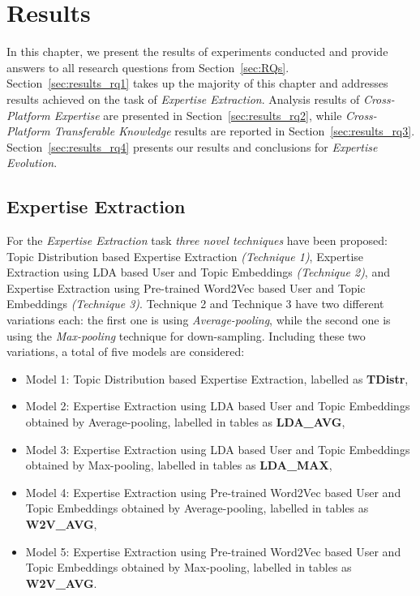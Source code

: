 \chapter{Results\label{chap:result}}

    In this chapter, we present the results of experiments conducted and provide answers to all research questions from Section~\ref{sec:RQs}. Section~\ref{sec:results_rq1} takes up the majority of this chapter and addresses results achieved on the task of \emph{Expertise Extraction}. Analysis results of \emph{Cross-Platform Expertise} are presented in Section~\ref{sec:results_rq2}, while \emph{Cross-Platform Transferable Knowledge} results are reported in Section~\ref{sec:results_rq3}.  Section~\ref{sec:results_rq4} presents our results and conclusions for \emph{Expertise Evolution}.

    \section{Expertise Extraction\label{sec:results_rq1}}
        
       For the \emph{Expertise Extraction} task \emph{three novel techniques} have been proposed: Topic Distribution based Expertise Extraction \emph{(Technique 1)}, Expertise Extraction using LDA based User and Topic Embeddings \emph{(Technique 2)}, and Expertise Extraction using Pre-trained Word2Vec based User and Topic Embeddings \emph{(Technique 3)}. Technique 2 and Technique 3 have two different variations each: the first one is using \emph{Average-pooling}, while the second one is using the \emph{Max-pooling} technique for down-sampling. Including these two variations, a total of five models are considered:
        
        \begin{itemize}
            \item Model 1: Topic Distribution based Expertise Extraction, labelled as \textbf{TDistr},
            \item Model 2: Expertise Extraction using LDA based User and Topic Embeddings obtained by Average-pooling, labelled in tables as \textbf{LDA\_AVG},
            \item Model 3: Expertise Extraction using LDA based User and Topic Embeddings obtained by Max-pooling, labelled in tables as \textbf{LDA\_MAX},
            \item Model 4: Expertise Extraction using Pre-trained Word2Vec based User and Topic Embeddings obtained by Average-pooling, labelled in tables as \textbf{W2V\_AVG},
            \item Model 5: Expertise Extraction using Pre-trained Word2Vec based User and Topic Embeddings obtained by Max-pooling, labelled in tables as \textbf{W2V\_AVG}.
        \end{itemize}
        
